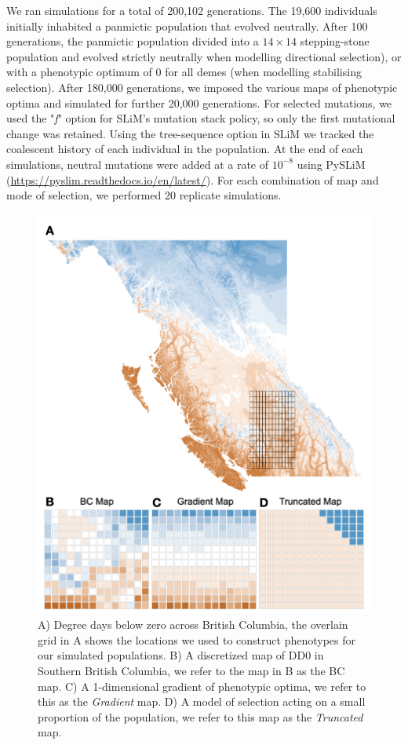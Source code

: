\documentclass[10pt,twoside,lineno]{GSA_format}
\begin{document}
We ran simulations for a total of 200,102 generations. The 19,600 individuals initially inhabited a panmictic population that evolved neutrally. After 100 generations, the panmictic population divided into a $14\times14$ stepping-stone population and evolved strictly neutrally when modelling directional selection), or with a phenotypic optimum of 0 for all demes (when modelling stabilising selection). After 180,000 generations, we imposed the various maps of phenotypic optima and simulated for further 20,000 generations.  For selected mutations, we used the "\textit{f}" option for SLiM's mutation stack policy, so only the first mutational change was retained. Using the tree-sequence option in SLiM \citep{Haller2019-za} we tracked the coalescent history of each individual in the population. At the end of each simulations, neutral mutations were added at a rate of $10^{-8}$ using PySLiM (\url{https://pyslim.readthedocs.io/en/latest/}). For each combination of map and mode of selection, we performed 20 replicate simulations. \\


\begin{figure}
  \includegraphics[width=\linewidth,keepaspectratio]{Plots/Figure1/Figure1}
  \caption{A) Degree days below zero across British Columbia, the overlain grid in A shows the locations we used to construct phenotypes for our simulated populations. B) A discretized map of DD0 in Southern British Columbia, we refer to the map in B as the BC map. C) A 1-dimensional gradient of phenotypic optima, we refer to this as the \textit{Gradient} map. D) A model of selection acting on a small proportion of the population, we refer to this map as the \textit{Truncated} map.}
  
  \label{fig:envGridPlot}
\end{figure}
\end{document}
